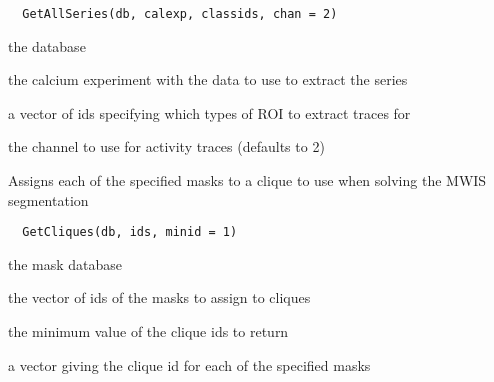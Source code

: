 \documentclass[a4paper]{book}
\begin{document}
%
\begin{Usage}
\begin{verbatim}
  GetAllSeries(db, calexp, classids, chan = 2)
\end{verbatim}
\end{Usage}
%
\begin{Arguments}
\begin{ldescription}
\item[\code{db}] the database

\item[\code{calexp}] the calcium experiment with the data to use
to extract the series

\item[\code{classids}] a vector of ids specifying which types of
ROI to extract traces for

\item[\code{chan}] the channel to use for activity traces
(defaults to 2)
\end{ldescription}
\end{Arguments}
%
\begin{Description}\relax
Assigns each of the specified masks to a clique to use
when solving the MWIS segmentation
\end{Description}
%
\begin{Usage}
\begin{verbatim}
  GetCliques(db, ids, minid = 1)
\end{verbatim}
\end{Usage}
%
\begin{Arguments}
\begin{ldescription}
\item[\code{db}] the mask database

\item[\code{ids}] the vector of ids of the masks to assign to
cliques

\item[\code{minid}] the minimum value of the clique ids to
return
\end{ldescription}
\end{Arguments}
%
\begin{Value}
a vector giving the clique id for each of the specified
masks
\end{Value}
\end{document}
